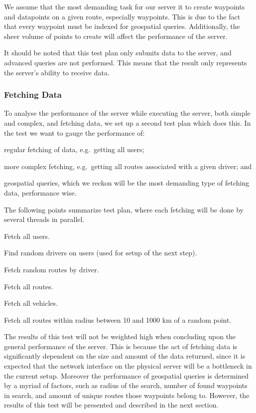 We assume that the most demanding task for our server it to create waypoints and datapoints on a given route, especially waypoints.
This is due to the fact that every waypoint must be indexed for geospatial queries.
Additionally, the sheer volume of points to create will affect the performance of the server.

It should be noted that this test plan only submits data to the server, and advanced queries are not performed.
This means that the result only represents the server's ability to receive data.

\subsubsection*{Fetching Data}
To analyse the performance of the server while executing the server, both simple and complex, and fetching data, we set up a second test plan which does this.
In the test we want to gauge the performance of:
\begin{enumberate*}
    \item regular fetching of data, e.g.~getting all users;
    \item more complex fetching, e.g.~getting all routes associated with a given driver; and
    \item geospatial queries, which we reckon will be the most demanding type of fetching data, performance wise.
\end{enumberate*}

The following points summarize test plan, where each fetching will be done by several threads in parallel.
\begin{enumberate}
    \item Fetch all users.
    \item Find random drivers on users (used for setup of the next step).
    \item Fetch random routes by driver.
    \item Fetch all routes.
    \item Fetch all vehicles.
    \item Fetch all routes within radius between 10 and 1000 km of a random point.
\end{enumberate}

The results of this test will not be weighted high when concluding upon the general performance of the server.
This is because the act of fetching data is significantly dependent on the size and amount of the data returned, since it is expected that the network interface on the physical server will be a bottleneck in the current setup.
Moreover the performance of geospatial queries is determined by a myriad of factors, such as radius of the search, number of found waypoints in search, and amount of unique routes those waypoints belong to.
However, the results of this test will be presented and described in the next section.
